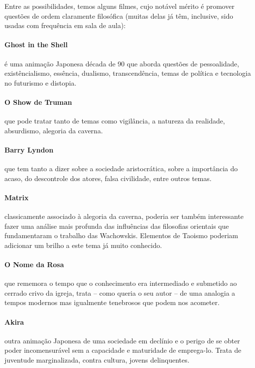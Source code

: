 \documentclass[12pt,a4paper]{article}
\newenvironment{citac}{
	\begin{addmargin}[4cm]{1em} \footnotesize}{\normalfont \end{addmargin}
}
\begin{document}
\begin{citac}
	Entre as possibilidades, temos alguns filmes, cujo notável
	mérito é promover questões de ordem claramente filosófica
	(muitas delas já têm, inclusive, sido usadas com frequência 
	em sala de aula): 

	\paragraph{Ghost in the Shell} é uma animação 
		Japonesa década de 90 que aborda questões de 
		pessoalidade, existêncialismo, essência, 
		dualismo, transcendência, temas de política e 
		tecnologia no futurismo e distopia.

	\paragraph{O Show de Truman} que pode tratar tanto de 
		temas como vigilância, a natureza da realidade,
		absurdismo, alegoria da caverna.

	\paragraph{Barry Lyndon} que tem tanto a dizer sobre a 
		sociedade aristocrática, sobre a importância do
		acaso, do descontrole dos atores, falsa 
		civilidade, entre outros temas.

	\paragraph{Matrix} classicamente associado à alegoria 
		da caverna, poderia ser também interessante 
		fazer uma análise mais profunda das influências 
		das filosofias orientais que fundamentaram o 
		trabalho das Wachowskis. Elementos de Taoismo 
		poderiam adicionar um brilho a este tema já 
		muito conhecido.

	\paragraph{O Nome da Rosa} que rememora o tempo que 
		o conhecimento era intermediado e submetido ao 
		cerrado crivo da igreja, trata -- como queria 
		o seu autor -- de uma analogia a tempos modernos 
		mas igualmente tenebrosos que podem nos acometer.

	\paragraph{Akira} outra animação Japonesa de uma 
		sociedade em declínio e o perigo de se obter 
		poder incomensurável sem a capacidade e 
		maturidade de emprega-lo. Trata de juventude 
		marginalizada, contra cultura, jovens 
		delinquentes.


\end{citac}
\end{document}
